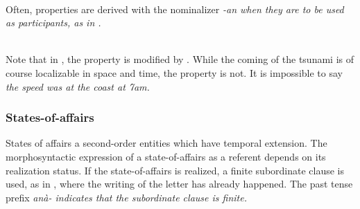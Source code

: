  \\
Often, properties are derived with the nominalizer \em -an \em when they are to be used as participants, as in .

 \\
Note that in , the property is modified by . While the coming of the tsunami is of course localizable in space and time, the property  is not. It is impossible to say \em the speed was at the coast at 7am\em.



%



\subsubsection{States-of-affairs}\label{sec:func:States-of-affairs}
States of affairs a second-order entities which have temporal extension. The morphosyntactic expression of a state-of-affairs as a referent depends on its realization status. If the state-of-affairs is realized, a finite subordinate clause is used, as in , where the writing of the letter has already happened. The past tense prefix \em anà- \em indicates that the subordinate clause is finite.

